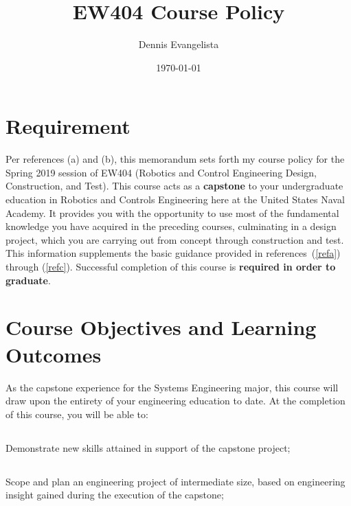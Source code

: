 \documentclass[10pt,courier]{navymemo}
\author{Dennis Evangelista}
\title{EW404 Course Policy}
\date{\today}
\begin{document}
\makedateblock{}

\MEMORANDUM{}

\begin{navyletterheader}
\navyskip{}%

\navysubjline{}
\navyskip{}%
\end{navyletterheader}

\section{Requirement}
Per references (a) and (b), this memorandum sets forth my course policy for the Spring 2019 session of EW404 (Robotics and Control Engineering Design, Construction, and Test).  This course acts as a \textbf{capstone} to your undergraduate education in Robotics and Controls Engineering here at the United States Naval Academy.  It provides you with the opportunity to use most of the fundamental knowledge you have acquired in the preceding courses, culminating in a design project, which you are carrying out from concept through construction and test.    This information supplements the basic guidance provided in references~(\ref{refa}) through (\ref{refc}). Successful completion of this course is \textbf{required in order to graduate}.

\section{Course Objectives and Learning Outcomes}  As the capstone experience for the Systems Engineering major, this course will draw upon the entirety of your engineering education to date.  At the completion of this course, you will be able to:
\subsection{} Demonstrate new skills attained in support of the capstone project;
\subsection{} Scope and plan an engineering project of intermediate size, based on engineering insight gained during the execution of the capstone;
\end{document}
